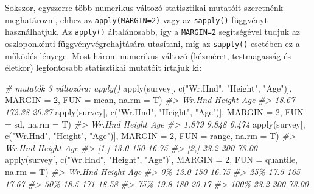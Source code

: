 \documentclass[
]{book}
\newenvironment{Shaded}{\begin{snugshade}}{\end{snugshade}}
\newcommand{\AttributeTok}[1]{\textcolor[rgb]{0.77,0.63,0.00}{#1}}
\newcommand{\CommentTok}[1]{\textcolor[rgb]{0.56,0.35,0.01}{\textit{#1}}}
\newcommand{\DecValTok}[1]{\textcolor[rgb]{0.00,0.00,0.81}{#1}}
\newcommand{\FunctionTok}[1]{\textcolor[rgb]{0.00,0.00,0.00}{#1}}
\newcommand{\NormalTok}[1]{#1}
\newcommand{\StringTok}[1]{\textcolor[rgb]{0.31,0.60,0.02}{#1}}
\begin{document}
Sokszor, egyszerre több numerikus változó statisztikai mutatóit szeretnénk meghatározni, ehhez az \texttt{apply(MARGIN=2)} vagy az \texttt{sapply()} függvényt használhatjuk. Az \texttt{apply()} általánosabb, így a \texttt{MARGIN=2} segítségével tudjuk az oszloponkénti függvényvégrehajtására utasítani, míg az \texttt{sapply()} esetében ez a működés lényege. Most három numerikus változó (kézméret, testmagasság és életkor) legfontosabb statisztikai mutatóit írtajuk ki:

\begin{Shaded}
\begin{Highlighting}[]
\CommentTok{\# mutatók 3 változóra: apply()}
\FunctionTok{apply}\NormalTok{(survey[, }\FunctionTok{c}\NormalTok{(}\StringTok{"Wr.Hnd"}\NormalTok{, }\StringTok{"Height"}\NormalTok{, }\StringTok{"Age"}\NormalTok{)], }\AttributeTok{MARGIN =} \DecValTok{2}\NormalTok{, }\AttributeTok{FUN =}\NormalTok{ mean, }\AttributeTok{na.rm =}\NormalTok{ T)}
\CommentTok{\#\textgreater{} Wr.Hnd Height    Age }
\CommentTok{\#\textgreater{}  18.67 172.38  20.37}
\FunctionTok{apply}\NormalTok{(survey[, }\FunctionTok{c}\NormalTok{(}\StringTok{"Wr.Hnd"}\NormalTok{, }\StringTok{"Height"}\NormalTok{, }\StringTok{"Age"}\NormalTok{)], }\AttributeTok{MARGIN =} \DecValTok{2}\NormalTok{, }\AttributeTok{FUN =}\NormalTok{ sd, }\AttributeTok{na.rm =}\NormalTok{ T)}
\CommentTok{\#\textgreater{} Wr.Hnd Height    Age }
\CommentTok{\#\textgreater{}  1.879  9.848  6.474}
\FunctionTok{apply}\NormalTok{(survey[, }\FunctionTok{c}\NormalTok{(}\StringTok{"Wr.Hnd"}\NormalTok{, }\StringTok{"Height"}\NormalTok{, }\StringTok{"Age"}\NormalTok{)], }\AttributeTok{MARGIN =} \DecValTok{2}\NormalTok{, }\AttributeTok{FUN =}\NormalTok{ range, }\AttributeTok{na.rm =}\NormalTok{ T)}
\CommentTok{\#\textgreater{}      Wr.Hnd Height   Age}
\CommentTok{\#\textgreater{} [1,]   13.0    150 16.75}
\CommentTok{\#\textgreater{} [2,]   23.2    200 73.00}
\FunctionTok{apply}\NormalTok{(survey[, }\FunctionTok{c}\NormalTok{(}\StringTok{"Wr.Hnd"}\NormalTok{, }\StringTok{"Height"}\NormalTok{, }\StringTok{"Age"}\NormalTok{)], }\AttributeTok{MARGIN =} \DecValTok{2}\NormalTok{, }\AttributeTok{FUN =}\NormalTok{ quantile, }\AttributeTok{na.rm =}\NormalTok{ T)}
\CommentTok{\#\textgreater{}      Wr.Hnd Height   Age}
\CommentTok{\#\textgreater{} 0\%     13.0    150 16.75}
\CommentTok{\#\textgreater{} 25\%    17.5    165 17.67}
\CommentTok{\#\textgreater{} 50\%    18.5    171 18.58}
\CommentTok{\#\textgreater{} 75\%    19.8    180 20.17}
\CommentTok{\#\textgreater{} 100\%   23.2    200 73.00}


\end{Highlighting}
\end{Shaded}
\end{document}
